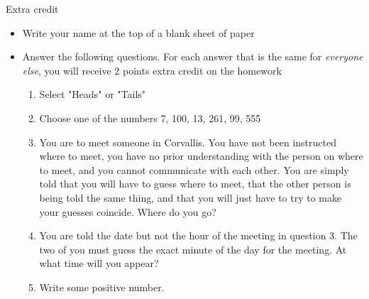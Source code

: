 \documentclass[10pt]{beamer}
\begin{document}
\begin{frame}[label={sec:orgc12bf41}]{}
\alert{Extra credit}
\begin{itemize}
\item Write your name at the top of a blank sheet of paper
\item Answer the following questions. For each answer that is the same for \emph{everyone else}, you will receive 2 points extra credit on the homework
\begin{enumerate}
\item Select "Heads" or "Tails"
\item Choose one of the numbers 7, 100, 13, 261, 99, 555
\item You are to meet someone in Corvallis. You have not been instructed where to meet, you have no prior understanding with the person on where to meet, and you cannot communicate with each other. You are simply told that you will have to guess where to meet, that the other person is being told the same thing, and that you will just have to try to make your guesses coincide. Where do you go?
\item You are told the date but not the hour of the meeting in question 3. The two of you must guess the exact minute of the day for the meeting. At what time will you appear?
\item Write some positive number.
\end{enumerate}
\end{itemize}
\end{frame}
\end{document}
